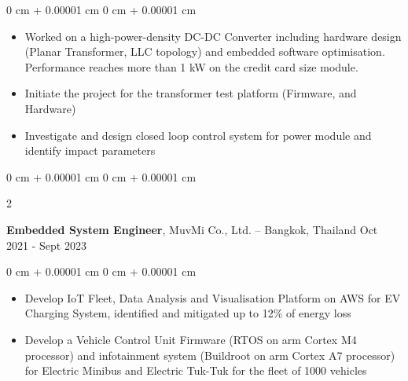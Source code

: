 \documentclass[10pt, a4paper]{article}
\newenvironment{highlights}{
    \begin{itemize}[
        topsep=0.10 cm,
        parsep=0.10 cm,
        partopsep=0pt,
        itemsep=0pt,
        leftmargin=0 cm + 10pt
    ]
}{
    \end{itemize}
} %
\newenvironment{onecolentry}{
    \begin{adjustwidth}{
        0 cm + 0.00001 cm
    }{
        0 cm + 0.00001 cm
    }
}{
    \end{adjustwidth}
} %
\newenvironment{twocolentry}[2][]{
    \onecolentry
    \def\secondColumn{#2}
    \setcolumnwidth{\fill, 4.5 cm}
    \begin{paracol}{2}
}{
    \switchcolumn \raggedleft \secondColumn
    \end{paracol}
    \endonecolentry
} %
\begin{document}
\begin{onecolentry}
	\begin{highlights}
		\item Worked on a high-power-density DC-DC Converter including hardware design (Planar Transformer, LLC topology) and embedded software optimisation. Performance reaches more than 1 kW on the credit card size module.
		\item Initiate the project for the transformer test platform (Firmware, and Hardware)
		\item Investigate and design closed loop control system for power module and identify impact parameters

	\end{highlights}
\end{onecolentry}

\vspace{0.10 cm}

\begin{twocolentry}{
		Oct 2021 - Sept 2023
	}
	\textbf{Embedded System Engineer}, MuvMi Co., Ltd. -- Bangkok, Thailand\end{twocolentry}
\begin{onecolentry}
	\begin{highlights}
		\item Develop IoT Fleet, Data Analysis and Visualisation Platform on AWS for EV Charging System, identified and mitigated up to 12\% of energy loss
		\item Develop a Vehicle Control Unit Firmware (RTOS on arm Cortex M4 processor) and infotainment system (Buildroot on arm Cortex A7 processor) for Electric Minibus and Electric Tuk-Tuk for the fleet of 1000 vehicles

	\end{highlights}
\end{onecolentry}







\end{document}
